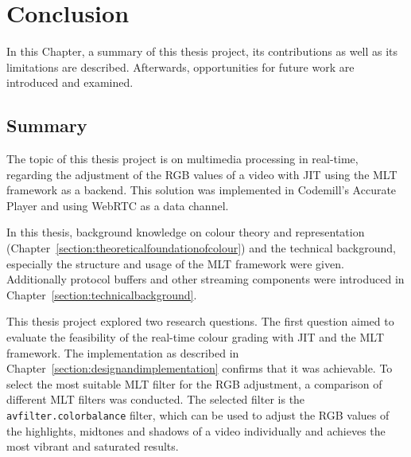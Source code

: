 \documentclass[../MasterThesis.tex]{subfiles}
\begin{document}
	
	
%
%
%
%
%
%
%
%
\newpage
\section{Conclusion} \label{section:conclusion}

In this Chapter, a summary of this thesis project, its contributions as well as its limitations are described. Afterwards, opportunities for future work are introduced and examined.






\subsection{Summary} \label{subsection:summary}


The topic of this thesis project is on multimedia processing in real-time, regarding the adjustment of the RGB values of a video with JIT using the MLT framework as a backend. This solution was implemented in Codemill's Accurate Player and using WebRTC as a data channel.

In this thesis, background knowledge on colour theory and representation (Chapter~\ref{section:theoreticalfoundationofcolour}) and the technical background, especially the structure and usage of the MLT framework were given. Additionally protocol buffers and other streaming components were introduced in Chapter~\ref{section:technicalbackground}.

This thesis project explored two research questions. The first question aimed to evaluate the feasibility of the real-time colour grading with JIT and the MLT framework. The implementation as described in Chapter~\ref{section:designandimplementation} confirms that it was achievable. To select the most suitable MLT filter for the RGB adjustment, a comparison of different MLT filters was conducted. The selected filter is the \texttt{avfilter.colorbalance} filter, which can be used to adjust the RGB values of the highlights, midtones and shadows of a video individually and achieves the most vibrant and saturated results.
\end{document}
